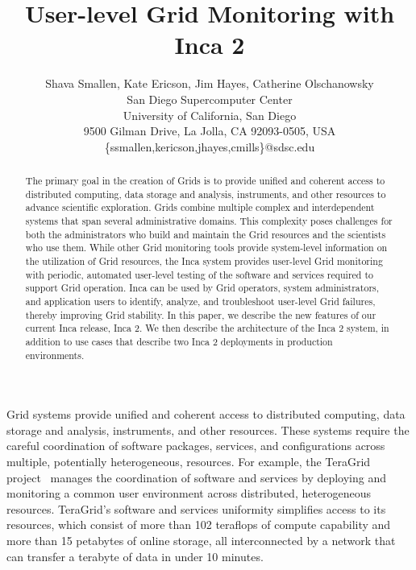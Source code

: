 \documentclass[times,10pt,twocolumn]{article}
\begin{document}
\title{User-level Grid Monitoring with Inca 2}

\author{Shava Smallen, Kate Ericson, Jim Hayes, Catherine Olschanowsky \\
San Diego Supercomputer Center\\ University of California, San Diego\\ 
9500 Gilman Drive, La Jolla, CA 92093-0505, USA\\ 
\{ssmallen,kericson,jhayes,cmills\}@sdsc.edu\\
}

\maketitle
\thispagestyle{empty}


\begin{abstract}
The primary goal in the creation of Grids is to provide unified and coherent
access to distributed computing, data storage and analysis, instruments, and
other resources to advance scientific exploration.  Grids combine multiple
complex and interdependent systems that span several administrative domains.
This complexity poses challenges for both the administrators who build and
maintain the Grid resources and the scientists who use them.  While other Grid
monitoring tools provide system-level information on the utilization of Grid
resources, the Inca system provides user-level Grid monitoring with periodic,
automated user-level testing of the software and services required to support
Grid operation.  Inca can be used by Grid operators, system administrators,
and application users to identify, analyze, and troubleshoot user-level Grid
failures, thereby improving Grid stability.  In this paper, we describe the new
features of our current Inca release, Inca 2.  We then describe the
architecture of the Inca 2 system, in addition to use cases that describe two
Inca 2 deployments in production environments.  
\end{abstract}

\label{intro}

Grid systems provide unified and coherent access to distributed computing,
data storage and analysis, instruments, and other resources.  These systems
require the careful coordination of software packages, services, and
configurations across multiple, potentially heterogeneous, resources.  For
example, the TeraGrid project~\cite{teragrid} manages the coordination of
software and services by deploying and monitoring a common user environment
across distributed, heterogeneous resources. 
TeraGrid's software and services uniformity simplifies access to its
resources, which consist of more than 102 teraflops of compute capability and
more than 15 petabytes of online storage, all interconnected by a network that
can transfer a terabyte of data in under 10 minutes.  
\end{document}
